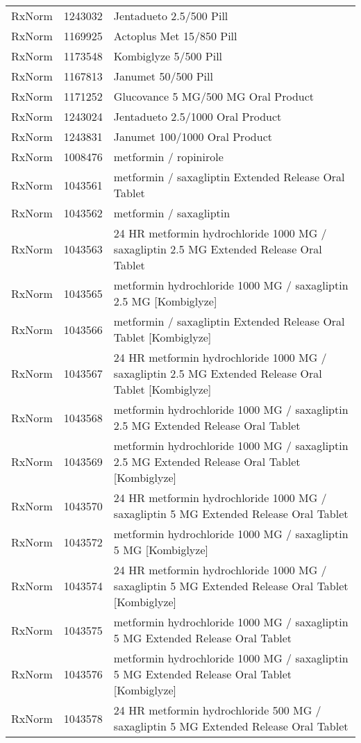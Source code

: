 \begin{longtable}{p{}p{}p{}}
  RxNorm & 1243032 & Jentadueto 2.5/500 Pill \\ 
  RxNorm & 1169925 & Actoplus Met 15/850 Pill \\ 
  RxNorm & 1173548 & Kombiglyze 5/500 Pill \\ 
  RxNorm & 1167813 & Janumet 50/500 Pill \\ 
  RxNorm & 1171252 & Glucovance 5 MG/500 MG Oral Product \\ 
  RxNorm & 1243024 & Jentadueto 2.5/1000 Oral Product \\ 
  RxNorm & 1243831 & Janumet 100/1000 Oral Product \\ 
  RxNorm & 1008476 & metformin / ropinirole \\ 
  RxNorm & 1043561 & metformin / saxagliptin Extended Release Oral Tablet \\ 
  RxNorm & 1043562 & metformin / saxagliptin \\ 
  RxNorm & 1043563 & 24 HR metformin hydrochloride 1000 MG / saxagliptin 2.5 MG Extended Release Oral Tablet \\ 
  RxNorm & 1043565 & metformin hydrochloride 1000 MG / saxagliptin 2.5 MG [Kombiglyze] \\ 
  RxNorm & 1043566 & metformin / saxagliptin Extended Release Oral Tablet [Kombiglyze] \\ 
  RxNorm & 1043567 & 24 HR metformin hydrochloride 1000 MG / saxagliptin 2.5 MG Extended Release Oral Tablet [Kombiglyze] \\ 
  RxNorm & 1043568 & metformin hydrochloride 1000 MG / saxagliptin 2.5 MG Extended Release Oral Tablet \\ 
  RxNorm & 1043569 & metformin hydrochloride 1000 MG / saxagliptin 2.5 MG Extended Release Oral Tablet [Kombiglyze] \\ 
  RxNorm & 1043570 & 24 HR metformin hydrochloride 1000 MG / saxagliptin 5 MG Extended Release Oral Tablet \\ 
  RxNorm & 1043572 & metformin hydrochloride 1000 MG / saxagliptin 5 MG [Kombiglyze] \\ 
  RxNorm & 1043574 & 24 HR metformin hydrochloride 1000 MG / saxagliptin 5 MG Extended Release Oral Tablet [Kombiglyze] \\ 
  RxNorm & 1043575 & metformin hydrochloride 1000 MG / saxagliptin 5 MG Extended Release Oral Tablet \\ 
  RxNorm & 1043576 & metformin hydrochloride 1000 MG / saxagliptin 5 MG Extended Release Oral Tablet [Kombiglyze] \\ 
  RxNorm & 1043578 & 24 HR metformin hydrochloride 500 MG / saxagliptin 5 MG Extended Release Oral Tablet \\ 

\end{longtable}
